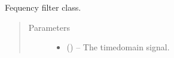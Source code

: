 \documentclass[letterpaper,10pt,english]{sphinxmanual}
\begin{document}
\begin{fulllineitems}
\label{\detokenize{references/freqfilter:nmrespy.freqfilter.FrequencyFilter}}
\sphinxAtStartPar
Fequency filter class.
\begin{quote}\begin{description}
\item[{Parameters}] \leavevmode\begin{itemize}
\item {} 
\sphinxAtStartPar
{} () – The time\sphinxhyphen{}domain signal.


\end{itemize}
\end{description}
\end{quote}
\end{fulllineitems}
\end{document}
